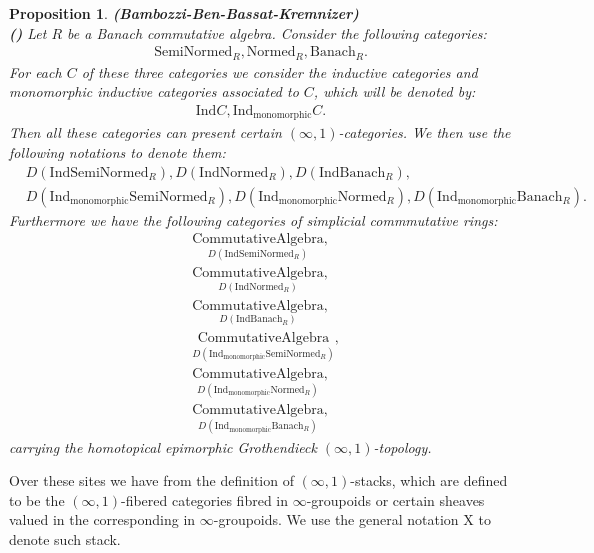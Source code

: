 \documentclass[12pt]{book}
\newtheorem{proposition}{Proposition}
\begin{document}
\begin{proposition}\mbox{\textbf{(Bambozzi-Ben-Bassat-Kremnizer)}}\\
\mbox{\textbf{(\cite[Definition 3.1, Theorem 3.14, Corollary 3.15, Remark 3.16]{BBBK})}}
Let $R$ be a Banach commutative algebra. Consider the following categories:
\begin{align}
\mathrm{SemiNormed}_R, \mathrm{Normed}_R, \mathrm{Banach}_R.
\end{align}
For each $C$ of these three categories we consider the inductive categories and monomorphic inductive categories associated to $C$, which will be denoted by:
\begin{align}
\mathrm{Ind}C,\mathrm{Ind}_\text{monomorphic}C.
\end{align}
Then all these categories can present certain $(\infty,1)$-categories. We then use the following notations to denote them:
\begin{align}
&D(\mathrm{Ind}\mathrm{SemiNormed}_R), D(\mathrm{Ind}\mathrm{Normed}_R), D(\mathrm{Ind}\mathrm{Banach}_R),\\
&D(\mathrm{Ind}_\text{monomorphic}\mathrm{SemiNormed}_R), D(\mathrm{Ind}_\text{monomorphic}\mathrm{Normed}_R), D(\mathrm{Ind}_\text{monomorphic}\mathrm{Banach}_R).
\end{align} 
Furthermore we have the following categories of simplicial commmutative rings:
\begin{align}
&\underset{D(\mathrm{Ind}\mathrm{SemiNormed}_R)}{\mathrm{CommutativeAlgebra}},\\ 
&\underset{D(\mathrm{Ind}\mathrm{Normed}_R)}{\mathrm{CommutativeAlgebra}},\\ 
&\underset{D(\mathrm{Ind}\mathrm{Banach}_R)}{\mathrm{CommutativeAlgebra}},\\
&\underset{D(\mathrm{Ind}_\text{monomorphic}\mathrm{SemiNormed}_R)}{\mathrm{CommutativeAlgebra}},\\ 
&\underset{D(\mathrm{Ind}_\text{monomorphic}\mathrm{Normed}_R)}{\mathrm{CommutativeAlgebra}},\\ 
&\underset{D(\mathrm{Ind}_\text{monomorphic}\mathrm{Banach}_R)}{\mathrm{CommutativeAlgebra}},
\end{align}
carrying the homotopical epimorphic Grothendieck $(\infty,1)$-topology.
\end{proposition}

\indent Over these sites we have from \cite[Definition 5.12]{BBBK} the definition of $(\infty,1)$-stacks, which are defined to be the $(\infty,1)$-fibered categories fibred in $\infty$-groupoids or certain sheaves valued in the corresponding in $\infty$-groupoids. We use the general notation $\mathrm{X}$ to denote such stack.
\end{document}
